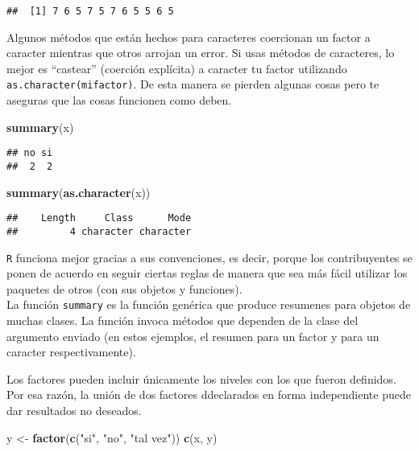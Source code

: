 \documentclass[]{article}
\newenvironment{Shaded}{\begin{snugshade}}{\end{snugshade}}
\newcommand{\KeywordTok}[1]{\textcolor[rgb]{0.13,0.29,0.53}{\textbf{#1}}}
\newcommand{\StringTok}[1]{\textcolor[rgb]{0.31,0.60,0.02}{#1}}
\newcommand{\NormalTok}[1]{#1}
\begin{document}
\begin{verbatim}
##  [1] 7 6 5 7 5 7 6 5 5 6 5
\end{verbatim}

Algunos métodos que están hechos para caracteres coercionan un factor a
caracter mientras que otros arrojan un error. Si usas métodos de
caracteres, lo mejor es ``castear'' (coerción explícita) a caracter tu
factor utilizando \texttt{as.character(mifactor)}. De esta manera se
pierden algunas cosas pero te aseguras que las cosas funcionen como
deben.

\begin{Shaded}
\begin{Highlighting}[]
\KeywordTok{summary}\NormalTok{(x)}
\end{Highlighting}
\end{Shaded}

\begin{verbatim}
## no si 
##  2  2
\end{verbatim}

\begin{Shaded}
\begin{Highlighting}[]
\KeywordTok{summary}\NormalTok{(}\KeywordTok{as.character}\NormalTok{(x))}
\end{Highlighting}
\end{Shaded}

\begin{verbatim}
##    Length     Class      Mode 
##         4 character character
\end{verbatim}

\begin{curiosidad}[Summary]
\texttt{R} funciona mejor gracias a sus convenciones, es decir, porque
los contribuyentes se ponen de acuerdo en seguir ciertas 
reglas de manera que sea más fácil utilizar los paquetes de otros
(con sus objetos y funciones).\\

La función \texttt{summary} es la función genérica que produce resumenes para objetos
de muchas clases. La función invoca métodos que dependen de la clase
del argumento enviado (en estos ejemplos, el resumen para un factor y para un 
caracter respectivamente).
\end{curiosidad}

Los factores pueden incluir únicamente los niveles con los que fueron
definidos. Por esa razón, la unión de dos factores ddeclarados en forma
independiente puede dar resultados no deseados.

\begin{Shaded}
\begin{Highlighting}[]
\NormalTok{y <-}\StringTok{ }\KeywordTok{factor}\NormalTok{(}\KeywordTok{c}\NormalTok{(}\StringTok{"si"}\NormalTok{, }\StringTok{"no"}\NormalTok{, }\StringTok{"tal vez"}\NormalTok{))}
\KeywordTok{c}\NormalTok{(x, y)}
\end{Highlighting}
\end{Shaded}
\end{document}
